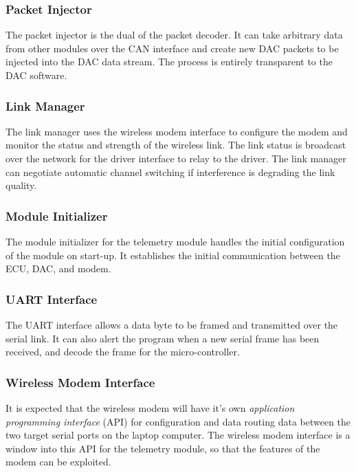 \subsubsection{Packet Injector}
\label{sec:design_telemetry_injector}

The packet injector is the dual of the packet decoder. It can take arbitrary data from other modules over the CAN interface and create new DAC packets to be injected into the DAC data stream. The process is entirely transparent to the DAC software.

\subsubsection{Link Manager}

The link manager uses the wireless modem interface to configure the modem and monitor the status and strength of the wireless link. The link status is broadcast over the network for the driver interface to relay to the driver. The link manager can negotiate automatic channel switching if interference is degrading the link quality.

\subsubsection{Module Initializer}

The module initializer for the telemetry module handles the initial configuration of the module on start-up. It establishes the initial communication between the ECU, DAC, and modem. 

\subsubsection{UART Interface}

The UART interface allows a data byte to be framed and transmitted over the serial link. It can also alert the program when a new serial frame has been received, and decode the frame for the micro-controller.

\subsubsection{Wireless Modem Interface}

It is expected that the wireless modem will have it's own \emph{application programming interface} (API) for configuration and data routing data between the two target serial ports on the laptop computer. The wireless modem interface is a window into this API for the telemetry module, so that the features of the modem can be exploited.
